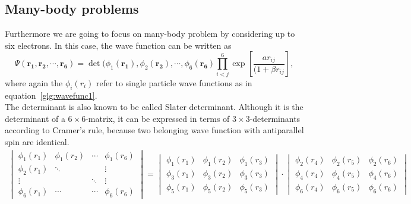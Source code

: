 \subsection{Many-body problems}
Furthermore we are going to focus on many-body problem by considering up to six electrons. In this case, the wave function can be written as
\begin{equation}
\Psi(\mathbf{r_1,r_2,\cdots, r_6}) = \det(\phi_1(\mathbf{r_1}),\phi_2(\mathbf{r_2}),\cdots,\phi_6(\mathbf{r_6}) \prod_{i<j}^6 \exp\left[\frac{a r_{ij}}{(1+\beta r_{ij}}\right],
\end{equation}
where again the $\phi_i(r_i)$ refer to single particle wave functions as in equation~\ref{glg:wavefunc1}.\\
The determinant is also known to be called Slater determinant. Although it is the determinant of a $6\times 6$-matrix, it can be expressed in terms of $3\times 3$-determinants according to Cramer's rule, because two belonging wave function with antiparallel spin are identical.  
\begin{align}
\begin{vmatrix}
\phi_1(r_1) & \phi_1(r_2) & \cdots & \phi_1(r_6)\\
\phi_2(r_1) & \ddots & &\vdots \\
\vdots & & \ddots& \vdots\\
\phi_6(r_1) & \cdots & \cdots & \phi_6(r_6)
\end{vmatrix}
=
\begin{vmatrix}
\phi_1(r_1)& \phi_1(r_2)& \phi_1(r_3)\\
\phi_3(r_1)& \phi_3(r_2)& \phi_3(r_3)\\
\phi_5(r_1)& \phi_5(r_2)& \phi_5(r_3)
\end{vmatrix}
\cdot
\begin{vmatrix}
\phi_2(r_4)& \phi_2(r_5)& \phi_2(r_6)\\
\phi_4(r_4)& \phi_4(r_5)& \phi_4(r_6)\\
\phi_6(r_4)& \phi_6(r_5)& \phi_6(r_6)
\end{vmatrix}
\end{align}